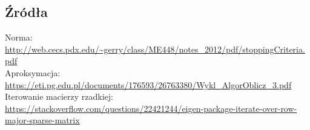 \documentclass[8pt]{article}
\begin{document}
\subsection*{Źródła}
Norma: \url{http://web.cecs.pdx.edu/~gerry/class/ME448/notes_2012/pdf/stoppingCriteria.pdf}\\
Aproksymacja: \url{https://eti.pg.edu.pl/documents/176593/26763380/Wykl_AlgorOblicz_3.pdf}\\
Iterowanie macierzy rzadkiej:\\ \url{https://stackoverflow.com/questions/22421244/eigen-package-iterate-over-row-major-sparse-matrix}
\end{document}
